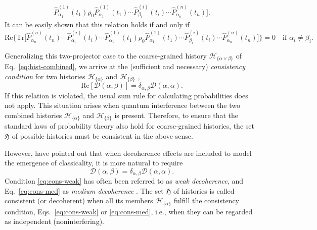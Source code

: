 \documentclass[twocolumn,rmp,aps,amsmath,amsfonts,noshowkeys,noshowpacs]{revtex4}
\begin{document}
\begin{widetext}
\begin{equation}
\begin{split}
\widehat{P}^{(1)}_{\alpha_1}(t_1) \rho_0 \nonumber 
\widehat{P}^{(1)}_{\alpha_1}(t_1) \cdots \widehat{P}^{(i)}_{\beta_i}(t_i) \cdots
\widehat{P}^{(n)}_{\alpha_n}(t_n) \big].
%
\end{split}
\end{equation}
%
It can be easily shown that this relation holds if and only if
%
\begin{equation}
%
\text{Re} \big\{ \text{Tr} \big[
\widehat{P}^{(n)}_{\alpha_n}(t_n) 
\cdots \widehat{P}^{(i)}_{\alpha_i}(t_i) \cdots 
\widehat{P}^{(1)}_{\alpha_1}(t_1) \rho_0 
\widehat{P}^{(1)}_{\alpha_1}(t_1) \cdots \widehat{P}^{(i)}_{\beta_i}(t_i) \cdots
\widehat{P}^{(n)}_{\alpha_n}(t_n)  \big] \big\} = 0 \quad \text{if $\alpha_i \not= \beta_i$}.
%
\end{equation}
%
\end{widetext}
%
\noindent Generalizing this two-projector case to the coarse-grained history
$\mathcal{H}_{\{\alpha \lor \beta\}}$ of Eq.~\eqref{eq:hist-combined},
we arrive at the (sufficient and necessary) {\em consistency condition}
for two histories $\mathcal{H}_{\{\alpha\}}$ and
$\mathcal{H}_{\{\beta\}}$
\citep{Griffiths:1984:tr,Omnes:1990:ww,Omnes:1992:gy},
%
\begin{equation} \label{eq:cons-weak}
\text{Re}[\mathcal{D}(\alpha,\beta)] = \delta_{\alpha,\beta}
\mathcal{D}(\alpha,\alpha).
\end{equation}
%
If this relation is violated, the usual sum rule for calculating
probabilities does not apply. This situation arises when quantum
interference between the two combined histories
$\mathcal{H}_{\{\alpha\}}$ and $\mathcal{H}_{\{\beta\}}$ is present.
Therefore, to ensure that the standard laws of probability theory also
hold for coarse-grained histories, the set $\mathfrak{H}$ of possible
histories must be consistent in the above sense.

However, \citet{GellMann:1990:uz} have pointed out that when
decoherence effects are included to model the emergence of
classicality, it is more natural to require
%
\begin{equation} \label{eq:cons-med}
\mathcal{D}(\alpha,\beta) = \delta_{\alpha,\beta}
\mathcal{D}(\alpha,\alpha).
\end{equation}
%
Condition \eqref{eq:cons-weak} has often been referred to as {\em weak
  decoherence}, and Eq.~\eqref{eq:cons-med} as {\em medium
  decoherence} \citep[for a proposal of a criterion for {\em strong
  decoherence}, see][]{GellMann:1998:xy}. The set $\mathfrak{H}$ of
histories is called consistent (or decoherent) when all its members
$\mathcal{H}_{\{\alpha\}}$ fulfill the consistency condition,
Eqs.~\eqref{eq:cons-weak} or \eqref{eq:cons-med}, i.e., when they can
be regarded as independent (noninterfering).
\end{document}
